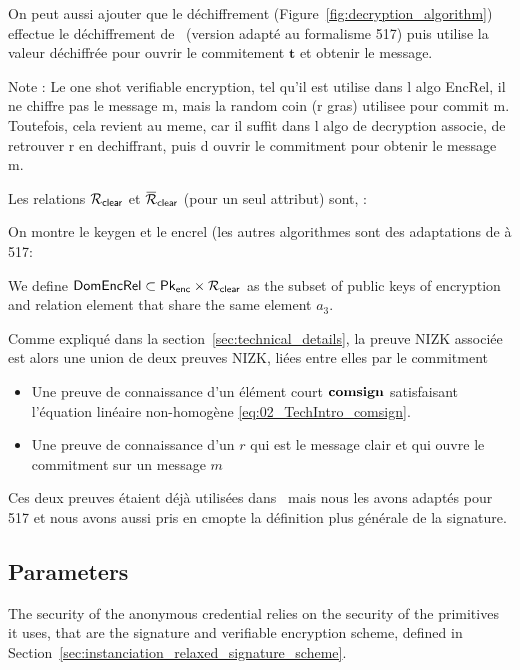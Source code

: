 On peut aussi ajouter que le déchiffrement (Figure~\ref{fig:decryption_algorithm}) effectue le déchiffrement de~\cite{EC:LyuNev17}
(version adapté au formalisme 517) puis utilise la valeur déchiffrée pour ouvrir le commitement $\mathbf{t}$ et obtenir le message.

Note : Le one shot verifiable encryption, tel qu'il est utilise dans l algo EncRel, 
il ne chiffre pas le message m, mais la random coin (r gras) utilisee pour 
commit m. Toutefois, cela revient au meme, car il suffit dans l algo de 
decryption associe, de retrouver r en dechiffrant, puis d ouvrir le commitment 
pour obtenir le message m.


Les relations $\mathcal{R}_{\mathsf{clear}}$ et $\barrelationclear$ (pour un seul attribut) sont, :


On montre le keygen et le encrel (les autres algorithmes sont des adaptations de 
\cite{EC:LyuNev17} à 517:

We define $\mathsf{DomEncRel} \subset \mathsf{Pk}_{\mathsf{enc}} \times \mathcal{R}_{\mathsf{clear}}$ as the subset of public keys of
encryption and relation element that share the same element $a_3$.



Comme expliqué dans la section~\ref{sec:technical_details}, la preuve NIZK 
associée est alors une
union de deux preuves NIZK, liées entre elles par le commitment
\begin{itemize}
	\item Une preuve de connaissance d'un élément court $\mathbf{comsign}$  satisfaisant l'équation
		linéaire non-homogène \eqref{eq:02_TechIntro_comsign}. 
	\item Une preuve de connaissance d'un $r$ qui est le message clair et qui ouvre le
		commitment sur un message $m$
\end{itemize}
Ces deux preuves étaient déjà utilisées dans~\cite{CCS:delLyuSei18} mais nous les avons adaptés pour
517 et nous avons aussi pris en cmopte la définition plus générale de la signature.
\fi

\subsection{Parameters}


The security of the anonymous credential relies on the security of the 
primitives it uses, that are the signature and verifiable encryption scheme, 
defined in 
Section~\ref{sec:instanciation_relaxed_signature_scheme}.

